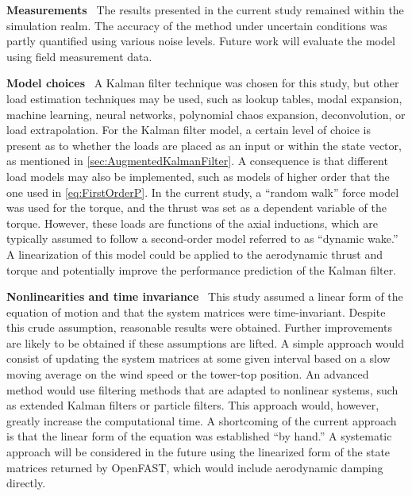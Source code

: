 \documentclass[wes, manuscript]{copernicus}
\newcommand\runinhead[1]{\par\vspace{0.3cm}\noindent\textbf{#1}\ }%
\begin{document}
\runinhead{Measurements} 
The results presented in the current study remained within the simulation realm. The accuracy of the method under uncertain conditions was partly quantified using various noise levels. 
Future work will evaluate the model using field measurement data.


\runinhead{Model choices}
A Kalman filter technique was chosen for this study, but other load estimation techniques may be used, such as lookup tables, modal expansion, machine learning, neural networks, polynomial chaos expansion, deconvolution, or load extrapolation.
For the Kalman filter model, a certain level of choice is present as to whether the loads are placed as an input or within the state vector, as mentioned in \autoref{sec:AugmentedKalmanFilter}.  
A consequence is that different load models may also be implemented, such as models of higher order that the one used in \autoref{eq:FirstOrderP}. 
In the current study, a ``random walk'' force model was used for the torque, and the thrust was set as a dependent variable of the torque.
However, these loads are functions of the axial inductions, which are typically assumed to follow a second-order model referred to as ``dynamic wake.'' 
A linearization of this model could be applied to the aerodynamic thrust and torque and potentially improve the performance prediction of the Kalman filter. 

\runinhead{Nonlinearities and time invariance}
This study assumed a linear form of the equation of motion and that the system matrices were time-invariant.
Despite this crude assumption, reasonable results were obtained. 
Further improvements are likely to be obtained if these assumptions are lifted. 
A simple approach would consist of updating the system matrices at some given interval based on a slow moving average on the wind speed or the tower-top position. 
An advanced method would use filtering methods that are adapted to nonlinear systems, such as extended Kalman filters or particle filters. 
This approach would, however, greatly increase the computational time.
A shortcoming of the current approach is that the linear form of the equation was established ``by hand.'' 
A systematic approach will be considered in the future using the linearized form of the state matrices returned by OpenFAST, which would include aerodynamic damping directly.
\end{document}
